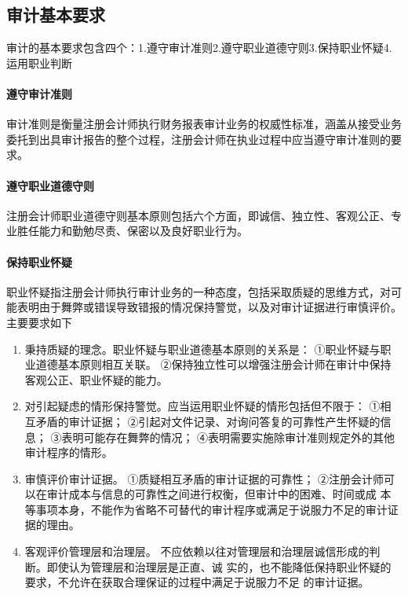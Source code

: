 \documentclass[UTF8,12pt]{ctexart}
\numberwithin{equation}{section} %
\numberwithin{figure}{section}
\numberwithin{table}{section}
\begin{document}
	\subsection{审计基本要求}
	审计的基本要求包含四个：1.遵守审计准则2.遵守职业道德守则3.保持职业怀疑4.运用职业判断
	
	\paragraph{遵守审计准则}
	
	审计准则是衡量注册会计师执行财务报表审计业务的权威性标准，涵盖从接受业务委托到出具审计报告的整个过程，注册会计师在执业过程中应当遵守审计准则的要求。
	
	\paragraph{遵守职业道德守则}
	
	注册会计师职业道德守则基本原则包括六个方面，即诚信、独立性、客观公正、专业胜任能力和勤勉尽责、保密以及良好职业行为。
	
	\paragraph{保持职业怀疑}

	职业怀疑指注册会计师执行审计业务的一种态度，包括采取质疑的思维方式，对可能表明由于舞弊或错误导致错报的情况保持警觉，以及对审计证据进行审慎评价。主要要求如下
	\begin{enumerate}
		\item 秉持质疑的理念。职业怀疑与职业道德基本原则的关系是：
		①职业怀疑与职业道德基本原则相互关联。
		②保持独立性可以增强注册会计师在审计中保持客观公正、职业怀疑的能力。
		
		\item 对引起疑虑的情形保持警觉。应当运用职业怀疑的情形包括但不限于：
		①相互矛盾的审计证据；
		②引起对文件记录、对询问答复的可靠性产生怀疑的信息；
		③表明可能存在舞弊的情况；
		④表明需要实施除审计准则规定外的其他审计程序的情形。
		
		\item 审慎评价审计证据。
		①质疑相互矛盾的审计证据的可靠性；
		②注册会计师可以在审计成本与信息的可靠性之间进行权衡，但审计中的困难、时间或成
		本等事项本身，不能作为省略不可替代的审计程序或满足于说服力不足的审计证据的理由。
		
		\item 客观评价管理层和治理层。
		不应依赖以往对管理层和治理层诚信形成的判断。即使认为管理层和治理层是正直、诚
		实的，也不能降低保持职业怀疑的要求，不允许在获取合理保证的过程中满足于说服力不足
		的审计证据。
	\end{enumerate}
	
\end{document}
